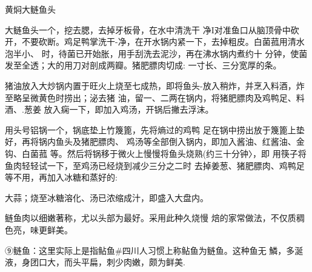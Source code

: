 \begin{recipe}{黄焖大鲢鱼头}

\ingredients









\cooking

\step 	大鲢鱼头一个，挖去腮，去掉牙板骨，在水中清洗干 净I对准鱼口从脑顶骨中砍开，不要砍断。鸡足鸭掌洗干-净，在开水锅内紧一下，去掉粗皮。白菌菰用清水泡半小、 时，待菌已开始胀，用手刮洗去泥沙，再在沸水锅内煮约十 分钟，使菌发至全透；大的用刀对剖成两瓣。猪肥膘肉切成: 一寸长、三分宽厚的条。

\step 	猪油放入大炒锅内置于旺火上烧至七成热，即将鱼头-放入稍炸，并烹入料酒，炸至略呈微黄色时捞出；泌去猪 油，留一、二两在锅内，将猪肥膘肉及鸡鸭足、料酒、.葱姜 放入痫一下，即加入鸡汤，开锅后撇去浮沫。

\step 	用头号铝锅一个，锅底垫上竹篾篦，先将熵过的鸡鸭 足在锅中捞出放于篾篦上垫好，再将锅内鱼头及猪肥膘肉、 鸡汤等全部倒入锅内，即加入酱油、红酱油、金钩、白菌菰 等。然后将锅移于微火上慢慢将鱼头烧熟(约三十分钟〉，即 用筷子将鱼肉轻轻试一下，至鸡汤已经烧到减少三分之二时 去掉姜葱、猪肥膘肉、鸡鸭足等不用，再加入冰糖和蒸好的:

大蒜；烧至冰糖溶化、汤已浓缩成汁，即盛入大盘内。

\notes

鲢鱼肉以细嫩著称，尤以头部为最好。采用此种久烧慢 焙的家常做法，不仅质稠色亮，味更鲜美。

⑨鲢鱼：这里实际上是指鲇鱼#四川人习惯上称鲇鱼为鲢鱼。这种鱼无 鱗，多涎液，身团口大，而头平扁，刺少肉嫩，颇为鲜美.

\end{recipe}


